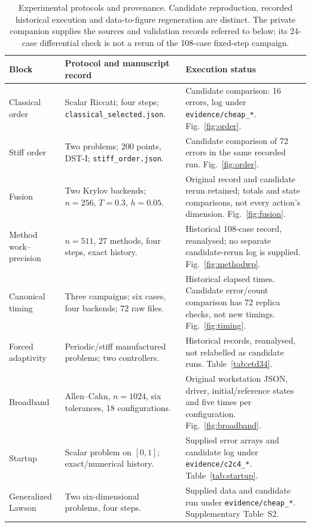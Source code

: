 \begin{table}[t]
\centering\small
\caption{Experimental protocols and provenance.  Candidate reproduction,
recorded historical execution and data-to-figure regeneration are distinct.
The private companion supplies the sources and validation records referred
to below; its 24-case differential check is not a rerun of the 108-case
fixed-step campaign.}\label{tab:protocol}
\begin{tabularx}{\linewidth}{@{}p{2.0cm}X X@{}}\toprule
Block & Protocol and manuscript record & Execution status\\\midrule
Classical order & Scalar Riccati; four steps; \texttt{classical\_selected.json}. & Candidate comparison: 16 errors, log under \texttt{evidence/cheap\_*}. Fig.~\ref{fig:order}.\\\addlinespace
Stiff order & Two problems; 200 points, DST-I; \texttt{stiff\_order.json}. & Candidate comparison of 72 errors in the same recorded run. Fig.~\ref{fig:order}.\\\addlinespace
Fusion & Two Krylov backends; $n=256$, $T=0.3$, $h=0.05$. & Original record and candidate rerun retained; totals and state comparisons, not every action's dimension. Fig.~\ref{fig:fusion}.\\\addlinespace
Method work--precision & $n=511$, 27 methods, four steps, exact history. & Historical 108-case record, reanalysed; no separate candidate-rerun log is supplied. Fig.~\ref{fig:methodwp}.\\\addlinespace
Canonical timing & Three campaigns; six cases, four backends; 72 raw files. & Historical elapsed times. Candidate error/count comparison has 72 replica checks, not new timings. Fig.~\ref{fig:timing}.\\\addlinespace
Forced adaptivity & Periodic/stiff manufactured problems; two controllers. & Historical records, reanalysed, not relabelled as candidate runs. Table~\ref{tab:etd34}.\\\addlinespace
Broadband & Allen--Cahn, $n=1024$, six tolerances, 18 configurations. & Original workstation JSON, driver, initial/reference states and five times per configuration. Fig.~\ref{fig:broadband}.\\\addlinespace
Startup & Scalar problem on $[0,1]$; exact/numerical history. & Supplied error arrays and candidate log under \texttt{evidence/c2c4\_*}. Table~\ref{tab:startup}.\\\addlinespace
Generalized Lawson & Two six-dimensional problems, four steps. & Supplied data and candidate run under \texttt{evidence/cheap\_*}. Supplementary Table~S2.\\
\bottomrule\end{tabularx}
\end{table}
